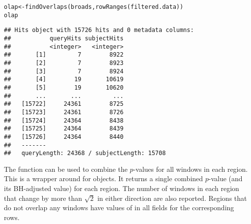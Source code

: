 \documentclass{report}\usepackage[]{graphicx}\usepackage[usenames,dvipsnames]{color}
\newcommand{\hlopt}[1]{\textcolor[rgb]{0,0,0}{#1}}%
\newcommand{\hlstd}[1]{\textcolor[rgb]{0.251,0.251,0.251}{#1}}%
\newcommand{\hlkwb}[1]{\textcolor[rgb]{0,0,0}{#1}}%
\newcommand{\hlkwd}[1]{\textcolor[rgb]{0.878,0.439,0.125}{#1}}%
\newenvironment{knitrout}{}{} %
\begin{document}
\begin{knitrout}
\color{fgcolor}\begin{kframe}
\begin{alltt}
\hlstd{olap} \hlkwb{<-} \hlkwd{findOverlaps}\hlstd{(broads,} \hlkwd{rowRanges}\hlstd{(filtered.data))}
\hlstd{olap}
\end{alltt}
\begin{verbatim}
## Hits object with 15726 hits and 0 metadata columns:
##           queryHits subjectHits
##           <integer>   <integer>
##       [1]         7        8922
##       [2]         7        8923
##       [3]         7        8924
##       [4]        19       10619
##       [5]        19       10620
##       ...       ...         ...
##   [15722]     24361        8725
##   [15723]     24361        8726
##   [15724]     24364        8438
##   [15725]     24364        8439
##   [15726]     24364        8440
##   -------
##   queryLength: 24368 / subjectLength: 15708
\end{verbatim}
\end{kframe}
\end{knitrout}

The  function can be used to combine the $p$-values for all windows in each region. 
This is a wrapper around  for  objects.
It returns a single combined $p$-value (and its BH-adjusted value) for each region. 
The number of windows in each region that change by more than $\sqrt{2}$ in either direction are also reported.
Regions that do not overlap any windows have values of  in all fields for the corresponding rows.

\begin{knitrout}
\color{fgcolor}
\end{knitrout}
\end{document}
